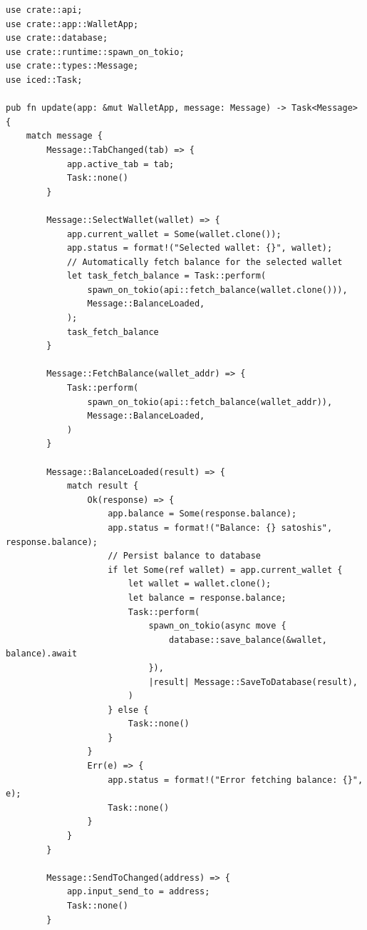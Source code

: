 \begin{listing}[H]
\caption{Update loop (excerpt) ()}
\label{lst:ch18-update}
\begin{verbatim}
use crate::api;
use crate::app::WalletApp;
use crate::database;
use crate::runtime::spawn_on_tokio;
use crate::types::Message;
use iced::Task;

pub fn update(app: &mut WalletApp, message: Message) -> Task<Message> {
    match message {
        Message::TabChanged(tab) => {
            app.active_tab = tab;
            Task::none()
        }

        Message::SelectWallet(wallet) => {
            app.current_wallet = Some(wallet.clone());
            app.status = format!("Selected wallet: {}", wallet);
            // Automatically fetch balance for the selected wallet
            let task_fetch_balance = Task::perform(
                spawn_on_tokio(api::fetch_balance(wallet.clone())),
                Message::BalanceLoaded,
            );
            task_fetch_balance
        }

        Message::FetchBalance(wallet_addr) => {
            Task::perform(
                spawn_on_tokio(api::fetch_balance(wallet_addr)),
                Message::BalanceLoaded,
            )
        }

        Message::BalanceLoaded(result) => {
            match result {
                Ok(response) => {
                    app.balance = Some(response.balance);
                    app.status = format!("Balance: {} satoshis", response.balance);
                    // Persist balance to database
                    if let Some(ref wallet) = app.current_wallet {
                        let wallet = wallet.clone();
                        let balance = response.balance;
                        Task::perform(
                            spawn_on_tokio(async move {
                                database::save_balance(&wallet, balance).await
                            }),
                            |result| Message::SaveToDatabase(result),
                        )
                    } else {
                        Task::none()
                    }
                }
                Err(e) => {
                    app.status = format!("Error fetching balance: {}", e);
                    Task::none()
                }
            }
        }

        Message::SendToChanged(address) => {
            app.input_send_to = address;
            Task::none()
        }


\end{verbatim}
\end{listing}
